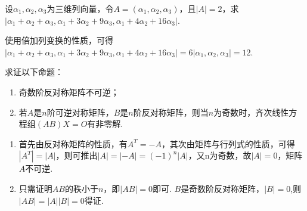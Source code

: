 \begin{exercise}

    \begin{exgroup}
        \item 设$\alpha_1,\alpha_2,\alpha_3$为三维列向量，令$A=(\alpha_1,\alpha_2,\alpha_3)$，且$|A|=2$，求$|\alpha_1+\alpha_2+\alpha_3,\alpha_1+3\alpha_2+9\alpha_3,\alpha_1+4\alpha_2+16\alpha_3|$.
        \begin{answer}
            使用倍加列变换的性质，可得$|\alpha_1+\alpha_2+\alpha_3,\alpha_1+3\alpha_2+9\alpha_3,\alpha_1+4\alpha_2+16\alpha_3|=6|\alpha_1,\alpha_2,\alpha_3|=12$.
        \end{answer}

        \item 求证以下命题：
        \begin{enumerate}
            \item 奇数阶反对称矩阵不可逆；

            \item 若$A$是$n$阶可逆对称矩阵，$B$是$n$阶反对称矩阵，则当$n$为奇数时，齐次线性方程组$(AB)X=O$有非零解.
        \end{enumerate}
        \begin{answer}
            \begin{enumerate}
                \item 首先由反对称矩阵的性质，有$A^T=-A$，其次由矩阵与行列式的性质，可得$|A^T|=|A|$，则可推出$|A|=|-A|=(-1)^n|A|$，又n为奇数，故$|A|=0$，矩阵$A$不可逆.

                \item 只需证明$AB$的秩小于$n$，即$|AB|=0$即可. $B$是奇数阶反对称矩阵，$|B|=0$,则$|AB|=|A||B|=0$得证.
            \end{enumerate}
        \end{answer}


\end{exgroup}
\end{exercise}
